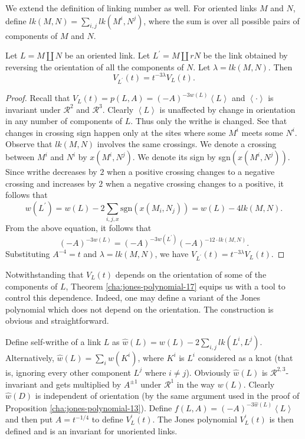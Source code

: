 We extend the definition of linking number as well. For oriented links $M$ and $N$, define $lk(M,N) = \sum_{i,j}^{} lk(M^i, N^j)$, where the sum is over all possible pairs of components of $M$ and $N$.

\begin{theorem}
\label{cha:jones-polynomial-17}
Let $L = M \coprod N$ be an oriented link. Let $L^{\prime} = M \coprod rN$ be the link obtained by reversing the orientation of all the components of $N$. Let $\lambda = lk(M,N)$. Then
\begin{equation}
\label{eq:3}
V_{L^{\prime}}(t) = t^{-3\lambda}V_L(t).
\end{equation}
\end{theorem}

\begin{proof}
  Recall that $V_L(t) = p(L,A) = (-A)^{-3w(L)}\left< L \right>$ and $\left< \cdot \right>$ is invariant under $\mathcal{R}^2$ and $\mathcal{R}^3$. Clearly $\left< L \right>$ is unaffected by change in orientation in any number of components of $L$. Thus only the writhe is changed. See that changes in crossing sign happen only at the sites where some $M^i$ meets some $N^i$. Observe that $lk(M,N)$ involves the same crossings. We denote a crossing between $M^i$ and $N^i$ by $x(M^i,N^j)$. We denote its sign by sgn$(x(M^i,N^j))$. Since writhe decreases by $2$ when a positive crossing changes to a negative crossing and increases by $2$ when a negative crossing changes to a positive, it follows that 
\begin{equation}
w(L^{\prime}) = w(L) - 2 \sum_{i,j,x}^{}\text{sgn} (x(M_i,N_j)) = w(L) - 4lk(M,N).
\end{equation}
From the above equation, it follows that 
\begin{equation}
\label{eq:4}
(-A)^{-3w(L)} = (-A)^{-3w(L^{\prime})}(-A)^{-12\cdot lk(M,N)}.
\end{equation}
Substituting $A^{-4} = t$ and $\lambda = lk(M,N)$, we have $V_{L^{\prime}}(t) = t^{-3\lambda} V_L(t)$.
\end{proof}

Notwithstanding that $V_L(t)$ depends on the orientation of some of the components of $L$, Theorem \ref{cha:jones-polynomial-17} equips us with a tool to control this dependence. Indeed, one may define a variant of the Jones polynomial which does not depend on the orientation. The construction is obvious and straightforward.

Define self-writhe of a link $L$ as $\hat{w}(L) = w(L) - 2 \sum_{i,j}^{}lk(L^i,L^j)$. Alternatively, $\hat{w}(L) = \sum_i^{}w(K^i)$, where $K^i$ is $L^i$ considered as a knot (that is, ignoring every other component $L^j$ where $i \ne j$). Obviously $\hat{w}(L)$ is $\mathcal{R}^{2,3}$-invariant and gets multiplied by $A^{\pm 1}$ under $\mathcal{R}^1$ in the way $w(L)$. Clearly $\hat{w}(D)$ is independent of orientation (by the same argument used in the proof of Proposition \ref{cha:jones-polynomial-13}). Define $f(L, A) = (-A)^{-3\hat{w}(L)}\left< L \right>$ and then put $A = t^{-1/4}$ to define $V^{\prime}_L(t)$. The Jones polynomial $V^{\prime}_L(t)$ is then defined and is an invariant for unoriented links.

